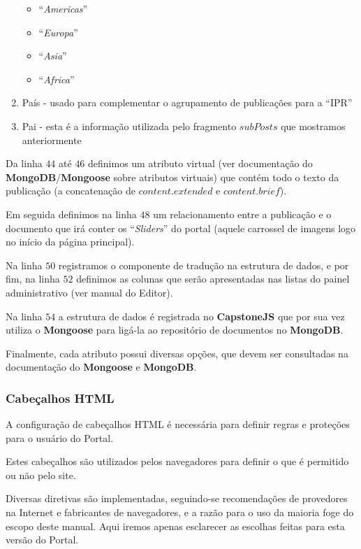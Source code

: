 \begin{enumerate}
        \begin{itemize}
            \item ``\textit{Americas}''
            \item ``\textit{Europa}''
            \item ``\textit{Asia}''
            \item ``\textit{Africa}''
        \end{itemize}
    \item País - usado para complementar o agrupamento de publicações para a ``IPR''
    \item Pai - esta é a informação utilizada pelo fragmento $subPosts$ que mostramos anteriormente
\end{enumerate}

Da linha $44$ até $46$ definimos um atributo virtual (ver documentação do \textbf{MongoDB}/\textbf{Mongoose} sobre atributos virtuais) que contém todo o texto da publicação (a concatenação de $content.extended$ e $content.brief$).

Em seguida definimos na linha $48$ um relacionamento entre a publicação e o documento que irá conter os ``\textit{Sliders}'' do portal (aquele carrossel de imagens logo no início da página principal).

Na linha $50$ registramos o componente de tradução na estrutura de dados, e por fim, na linha $52$ definimos as colunas que serão apresentadas nas listas do painel administrativo (ver manual do Editor).

Na linha $54$ a estrutura de dados é registrada no \textbf{CapstoneJS} que por sua vez utiliza o \textbf{Mongoose} para ligá-la ao repositório de documentos no \textbf{MongoDB}.

Finalmente, cada atributo possui diversas opções, que devem ser consultadas na documentação do \textbf{Mongoose} e \textbf{MongoDB}.

\subsubsection{Cabeçalhos HTML}

A configuração de cabeçalhos \gls{HTML} é necessária para definir regras e proteções para o usuário do Portal.

Estes cabeçalhos são utilizados pelos navegadores para definir o que é permitido ou não pelo site.

Diversas diretivas são implementadas, seguindo-se recomendações de provedores na Internet e fabricantes de navegadores, e a razão para o uso da maioria foge do escopo deste manual. Aqui iremos apenas esclarecer as escolhas feitas para esta versão do Portal.

